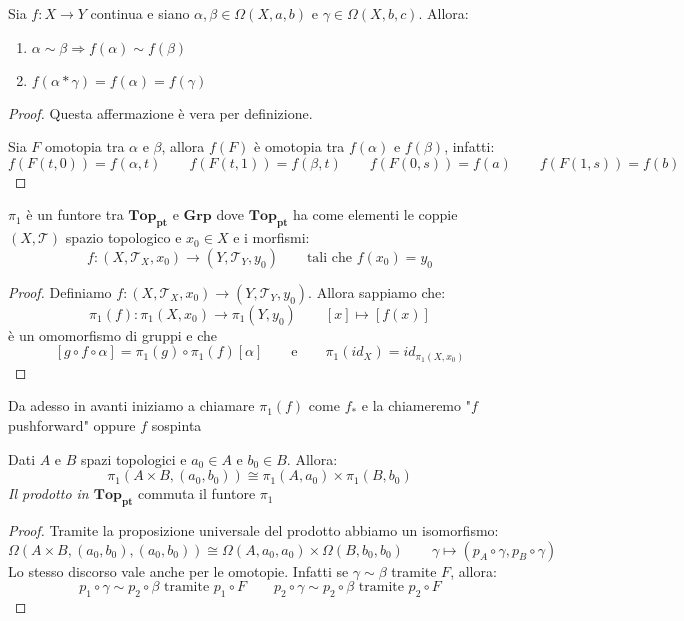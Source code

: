 \documentclass[11pt,a4paper,twoside]{article}
\theoremstyle{definition}
\begin{document}
\begin{prop}{}{}
	Sia $f:X \to Y$ continua e siano $\alpha, \beta \in \Omega(X, a, b)$ e $\gamma \in \Omega(X, b,c)$. Allora:
	\begin{enumerate}
		\item $\alpha \sim \beta \Rightarrow f(\alpha) \sim f(\beta)$
		\item $f(\alpha*\gamma) = f(\alpha) = f(\gamma)$
	\end{enumerate}
\end{prop}
\begin{proof}
	 Questa affermazione è vera per definizione.

	 Sia $F$ omotopia tra $\alpha$ e $\beta$, allora $f(F)$ è omotopia tra $f(\alpha)$ e $f(\beta)$, infatti:
	\[ f(F(t,0)) = f(\alpha, t)\qquad f(F(t,1)) = f(\beta,t)\qquad f(F(0,s)) = f(a)\qquad f(F(1,s)) = f(b) \]
\end{proof}

\begin{thm}{}{}
	$\pi_1$ è un funtore tra $\bm{Top_{pt}}$ e $\bm{Grp}$ dove $\bm{Top_{pt}}$ ha come elementi le coppie $(X, \mathcal T)$ spazio topologico e $x_0 \in X$ e i morfismi:
	\[ f:(X, \mathcal T_X, x_0) \to (Y, \mathcal T_Y, y_0)\qquad \text{tali che }f(x_0) = y_0 \]
\end{thm}
\begin{proof}
	Definiamo $f:(X, \mathcal T_X, x_0) \to (Y, \mathcal T_Y, y_0)$. Allora sappiamo che:
	\[ \pi_1(f):\pi_1(X, x_0) \to \pi_1(Y, y_0)\qquad [x] \mapsto [f(x)] \]
	è un omomorfismo di gruppi e che
	\[[g\circ f \circ \alpha] = \pi_1(g) \circ \pi_1(f)[\alpha]\qquad \text{e}\qquad \pi_1(id_X) = id_{\pi_1(X, x_0)}\]
\end{proof}

Da adesso in avanti iniziamo a chiamare $\pi_1(f)$ come $f_*$ e la chiameremo "$f$ pushforward" oppure $f$ sospinta

\begin{prop}{}{}
	Dati $A$ e $B$ spazi topologici e $a_0 \in A$ e $b_0 \in B$. Allora:
	\[ \pi_1(A \times B, (a_0, b_0)) \cong \pi_1(A,a_0) \times \pi_1(B, b_0)\]
	\textit{Il prodotto in $\bm{Top_{pt}}$} commuta il funtore $\pi_1$
\end{prop}
\begin{proof}
	Tramite la proposizione universale del prodotto abbiamo un isomorfismo:
	\[ \Omega(A \times B, (a_0,b_0), (a_0,b_0)) \cong \Omega(A, a_0, a_0)\times \Omega(B, b_0,b_0) \qquad \gamma \mapsto (p_A \circ \gamma, p_B \circ \gamma)\]
	Lo stesso discorso vale anche per le omotopie. Infatti se $\gamma \sim \beta$ tramite $F$, allora:
	\[ p_1 \circ \gamma \sim p_2 \circ \beta \text{ tramite }p_1 \circ F\qquad p_2 \circ \gamma \sim p_2 \circ \beta\text{ tramite }p_2 \circ F \]
\end{proof}
\end{document}
